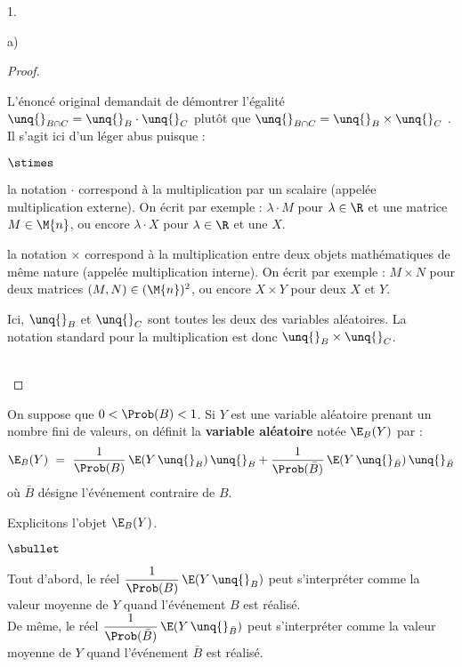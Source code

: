 \documentclass[11pt]{article}%
\begin{document}
\begin{noliste}{1.}
\begin{noliste}{a)}
\begin{proof}
      
      \newpage
      
      
      \begin{remark}
        L'énoncé original demandait de démontrer l'égalité \og $
        \unq{}_{B \cap C} = \unq{}_B \cdot \unq{}_C$ \fg{} plutôt que 
        \og $\unq{}_{B \cap C} = \unq{}_B \times \unq{}_C$ \fg{}.\\
        Il s'agit ici d'un léger abus puisque :
        \begin{noliste}{$\stimes$}
          \item la notation $\cdot$ correspond à la multiplication par 
          un scalaire (appelée multiplication externe). On écrit par 
	  exemple : $\lambda \cdot M$ pour 
          $\lambda \in \R$ et une matrice $M \in \M{n}$, ou encore 
	  $\lambda \cdot 
          X$ pour $\lambda \in \R$ et une \var $X$.
          
          \item la notation $\times$ correspond à la multiplication
          entre deux objets mathématiques de même nature (appelée 
          multiplication interne). On écrit par exemple : $M \times N$
          pour deux matrices $(M,N) \in (\M{n})^2$, ou encore $X \times
          Y$ pour deux \var $X$ et $Y$.
        \end{noliste}
        Ici, $\unq{}_B$ et $\unq{}_C$ sont toutes les deux des 
        variables aléatoires. La notation standard pour la 
        multiplication est donc $\unq{}_B \times \unq{}_C$.
      \end{remark}~\\[-1.4cm]
    \end{proof}
    
    \item On suppose que $0 < \Prob(B) < 1$. Si $Y$ est une variable
    aléatoire prenant un nombre fini de valeurs, on définit la {\bf 
    variable aléatoire} notée $\E_B(Y)$ par :
    \[
      \E_B(Y) \ = \ \dfrac{1}{\Prob(B)} \, \E(Y \, \unq{}_B) \, 
      \unq{}_B + \dfrac{1}{\Prob(\bar{B})} \, \E(Y \, \unq{}_{\bar{B}})
      \, \unq{}_{\bar{B}}
    \]
    où $\bar{B}$ désigne l'événement contraire de $B$.
    
    \begin{remarkL}{.96}
      Explicitons l'objet $\E_B(Y)$.
      \begin{noliste}{$\sbullet$}
        \item Tout d'abord, le réel $\dfrac{1}{\Prob(B)}
        \, \E(Y \, \unq{}_B)$ peut s'interpréter comme la valeur 
        moyenne de $Y$ quand l'événement $B$ est réalisé.\\[.1cm]
        De même, le réel $\dfrac{1}{\Prob(\bar{B})}
        \, \E(Y \, \unq{}_{\bar{B}})$ peut s'interpréter comme la 
	valeur moyenne de $Y$ quand l'événement $\bar{B}$ est réalisé.
	

\end{noliste}
\end{remarkL}
\end{noliste}
\end{noliste}
\end{document}
